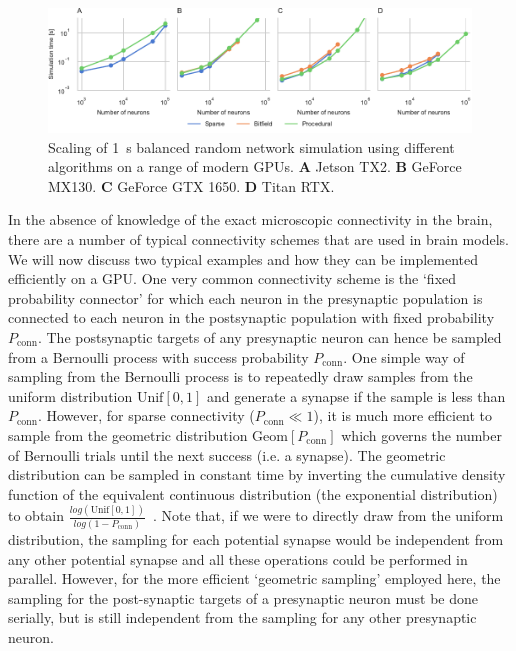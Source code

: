 \documentclass[9pt,a4paper]{amsart}
\newenvironment{fullwidth}{%
  \begin{adjustwidth}{-0.85in}{-0.85in}
}{\end{adjustwidth}}
\begin{document}
\begin{figure}
    \begin{fullwidth}
        \centering
        \includegraphics{figures/performance_scaling}
        \captionsetup{width=6.69in}
        \caption{Scaling of \SI{1}{\second} balanced random network simulation using different algorithms on a range of modern GPUs. 
        \textbf{A} Jetson TX2.
        \textbf{B} GeForce MX130.
        \textbf{C} GeForce GTX 1650.
        \textbf{D} Titan RTX.}
        \label{fig:performance_scaling}
    \end{fullwidth}
\end{figure}

In the absence of knowledge of the exact microscopic connectivity in the brain, there are a number of typical connectivity schemes that are used in brain models.
We will now discuss two typical examples and how they can be implemented efficiently on a GPU.
One very common connectivity scheme is the `fixed probability connector' for which each neuron in the presynaptic population is connected to each neuron in the postsynaptic population with fixed probability $P_{\text{conn}}$.
The postsynaptic targets of any presynaptic neuron can hence be sampled from a Bernoulli process with success probability $P_{\text{conn}}$.
One simple way of sampling from the Bernoulli process is to repeatedly draw samples from the uniform distribution $\text{Unif}[0, 1]$ and generate a synapse if the sample is less than $P_{\text{conn}}$.
However, for sparse connectivity ($P_{\text{conn}} \ll 1$), it is much more efficient to sample from the geometric distribution $\text{Geom}[P_{\text{conn}}]$ which governs the number of Bernoulli trials until the next success (i.e. a synapse).
The geometric distribution can be sampled in constant time by inverting the cumulative density function of the equivalent continuous distribution (the exponential distribution) to obtain $\frac{log(\text{Unif}[0, 1])}{log(1 - P_{\text{conn}})}$~\citep[p499]{DevroyeLuc2013}.
Note that, if we were to directly draw from the uniform distribution, the sampling for each potential synapse would be independent from any other potential synapse and all these operations could be performed in parallel.
However, for the more efficient `geometric sampling' employed here, the sampling for the post-synaptic targets of a presynaptic neuron must be done serially, but is still independent from the sampling for any other presynaptic neuron.
\end{document}
